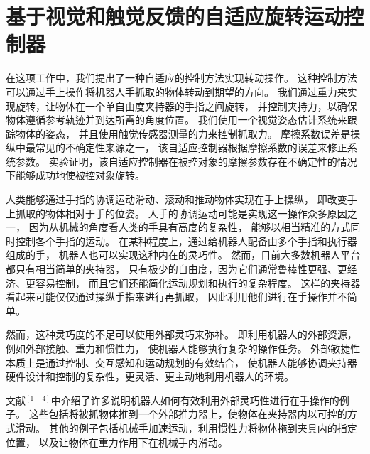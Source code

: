 \setcounter{appequ}{0}
\renewcommand\theequation{\arabic{appequ}}

\setlength{\parsep}{0ex}%
\setlength{\topsep}{1ex}%
\setlength{\itemsep}{0ex}%

\chapter{基于视觉和触觉反馈的自适应旋转运动控制器}\label{apx_1}

在这项工作中，我们提出了一种自适应的控制方法实现转动操作。
这种控制方法可以通过手上操作将机器人手抓取的物体转动到期望的方向。
我们通过重力来实现旋转，让物体在一个单自由度夹持器的手指之间旋转，
并控制夹持力，以确保物体遵循参考轨迹并到达所需的角度位置。
我们使用一个视觉姿态估计系统来跟踪物体的姿态，
并且使用触觉传感器测量的力来控制抓取力。
摩擦系数误差是操纵中最常见的不确定性来源之一，
该自适应控制器根据摩擦系数的误差来修正系统参数。
实验证明，该自适应控制器在被控对象的摩擦参数存在不确定性的情况下能够成功地使被控对象旋转。

人类能够通过手指的协调运动滑动、滚动和推动物体实现在手上操纵，
即改变手上抓取的物体相对于手的位姿。
人手的协调运动可能是实现这一操作众多原因之一，
因为从机械的角度看人类的手具有高度的复杂性，
能够以相当精准的方式同时控制各个手指的运动。
在某种程度上，通过给机器人配备由多个手指和执行器组成的手，
机器人也可以实现这种内在的灵巧性。
然而，目前大多数机器人平台都只有相当简单的夹持器，
只有极少的自由度，因为它们通常鲁棒性更强、更经济、更容易控制，
而且它们还能简化运动规划和执行的复杂程度。
这样的夹持器看起来可能仅仅通过操纵手指来进行再抓取，
因此利用他们进行在手操作并不简单。

然而，这种灵巧度的不足可以使用外部灵巧来弥补。
即利用机器人的外部资源，例如外部接触、重力和惯性力，
使机器人能够执行复杂的操作任务。
外部敏捷性本质上是通过控制、交互感知和运动规划的有效结合，
使机器人能够协调夹持器硬件设计和控制的复杂性，更灵活、更主动地利用机器人的环境。

文献$^{[1-4]}$中介绍了许多说明机器人如何有效利用外部灵巧性进行在手操作的例子。
这些包括将被抓物体推到一个外部推力器上，使物体在夹持器内以可控的方式滑动。
其他的例子包括机械手加速运动，利用惯性力将物体拖到夹具内的指定位置，
以及让物体在重力作用下在机械手内滑动。

